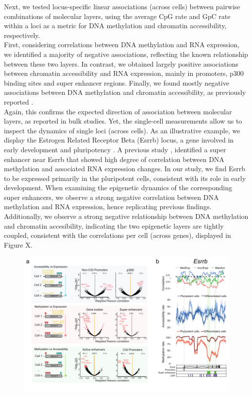 Next, we tested locus-specific linear associations (across cells) between pairwise combinations of molecular layers, using the average CpG rate and GpC rate within a loci as a metric for DNA methylation and chromatin accessibility, respectively.\\
First, considering correlations between DNA methylation and RNA expression, we identified a majority of negative associations, reflecting the known relationship between these two layers. In contrast, we obtained largely positive associations between chromatin accessibility and RNA expression, mainly in promoters, p300 binding sites and super enhancer regions. Finally, we found mostly negative associations between DNA methylation and chromatin accessibility, as previously reported \cite{XX}.\\
Again, this confirms the expected direction of association between molecular layers, as reported in bulk studies. Yet, the single-cell measurements allow us to inspect the dynamics of single loci (across cells). As an illustrative example, we display the Estrogen Related Receptor Beta (Esrrb) locus, a gene involved in early development and pluripotency \cite{Papp2012}. A previous study \cite{Angermueller2016}, identified a super enhancer near Esrrb that showed high degree of correlation between DNA methylation and associated RNA expression changes. In our study, we find Esrrb to be expressed primarily in the pluripotent cells, consistent with its role in early development. When examining the epigenetic dynamics of the corresponding super enhancers, we observe a strong negative correlation between DNA methylation and RNA expression, hence replicating previous findings. Additionally, we observe a strong negative relationship between DNA methylation and chromatin accesibility, indicating the two epigenetic layers are tightly coupled, consistent with the correlations per cell (across genes), displayed in Figure X.

\begin{figure}[H]
	\centering
	\includegraphics[width=0.9\linewidth]{scNMT_EB_correlations}
	\caption[]{}
	\label{fig:scnmt_eb_correlations}
\end{figure}

